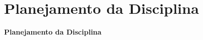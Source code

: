 



\section[Planejamento da Disciplina]{Planejamento da Disciplina}\label{sec:planejamento}



{
  \begin{frame}[plain]%

    \vfill

    \centering{}
    \Huge{\textbf{Planejamento da Disciplina}}

    \vfill

  \end{frame}
} %



